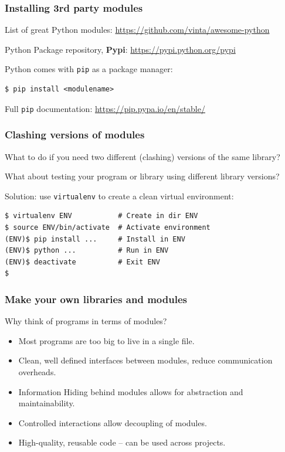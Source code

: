 \documentclass{beamer} %
\newcommand\emc[1]{\textcolor{midred}{\textbf{#1}}}
\begin{document}
\begin{frame}[fragile]

\frametitle{Installing 3rd party modules}

List of great Python modules: \url{https://github.com/vinta/awesome-python}

Python Package repository, \emc{Pypi}: \url{https://pypi.python.org/pypi}

\vspace{3mm}
Python comes with \texttt{pip} as a package manager:
\begin{verbatim}
$ pip install <modulename>
\end{verbatim}
Full \texttt{pip} documentation: \url{https://pip.pypa.io/en/stable/}

\end{frame}


\begin{frame}[fragile]

\frametitle{Clashing versions of modules}

What to do if you need two different (clashing) versions of the same library?

What about testing your program or library using different library versions?

\vspace{5mm}
Solution: use \texttt{virtualenv} to create a clean virtual environment:
\begin{small}
\begin{verbatim}
$ virtualenv ENV           # Create in dir ENV
$ source ENV/bin/activate  # Activate environment
(ENV)$ pip install ...     # Install in ENV
(ENV)$ python ...          # Run in ENV
(ENV)$ deactivate          # Exit ENV
$
\end{verbatim}
\end{small}

\end{frame}


\begin{frame}

\frametitle{Make your own libraries and modules}

Why think of programs in terms of modules?
\begin{itemize}
  \item Most programs are too big to live in a single file.
  \item Clean, well defined interfaces between modules, reduce communication overheads. 
  \item Information Hiding behind modules allows for abstraction and maintainability.
  \item Controlled interactions allow decoupling of modules.
  \item High-quality, reusable code -- can be used across projects.
\end{itemize}

\end{frame}
\end{document}
